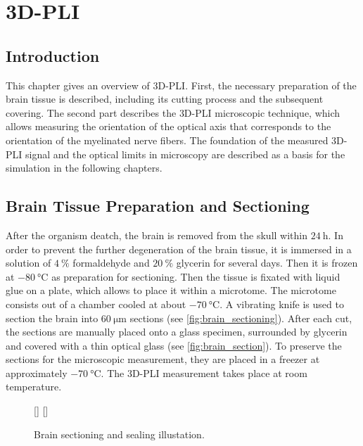 \cleardoublepage
\setcounter{chapter}{3}
\chapter{3D-PLI}
\label{sec:pli}
%
\section{Introduction}
% 
This chapter gives an overview of \ac{3D-PLI}.
First, the necessary preparation of the brain tissue is described, including its cutting process and the subsequent covering.
The second part describes the \ac{3D-PLI} microscopic technique, which allows measuring the orientation of the optical axis that corresponds to the orientation of the myelinated nerve fibers.
The foundation of the measured \ac{3D-PLI} signal and the optical limits in microscopy are described as a basis for the simulation in the following chapters. 
% 
% 
% 
\section{Brain Tissue Preparation and Sectioning}
% 
After the organism deatch, the brain is removed from the skull within $\SI{24}{\hour}$.
In order to prevent the further degeneration of the brain tissue, it is immersed in a solution of $\SI{4}{\percent}$ formaldehyde and $\SI{20}{\percent}$ glycerin for several days.
Then it is frozen at $\SI{-80}{\celsius}$ as preparation for sectioning.
Then the tissue is fixated with liquid glue on a plate, which allows to place it within a microtome.
The microtome consists out of a chamber cooled at about $\SI{-70}{\celsius}$.
A vibrating knife is used to section the brain into $\SI{60}{\micro\meter}$ sections (see \cref{fig:brain_sectioning}).
After each cut, the sections are manually placed onto a glass specimen, surrounded by glycerin and covered with a thin optical glass (see \cref{fig:brain_section}).
To preserve the sections for the microscopic measurement, they are placed in a freezer at approximately $\SI{-70}{\celsius}$.
The \ac{3D-PLI} measurement takes place at room temperature. \cite{Axer2011}
% 
\begin{figure}[!t]
	\centering
    \setlength{\tikzwidth}{0.475\textwidth}
    [\tikzwidth]{}
    \hfill
    [\tikzwidth]{}
	\caption{Brain sectioning and sealing illustation.}
\end{figure}
% 
% 
% 
